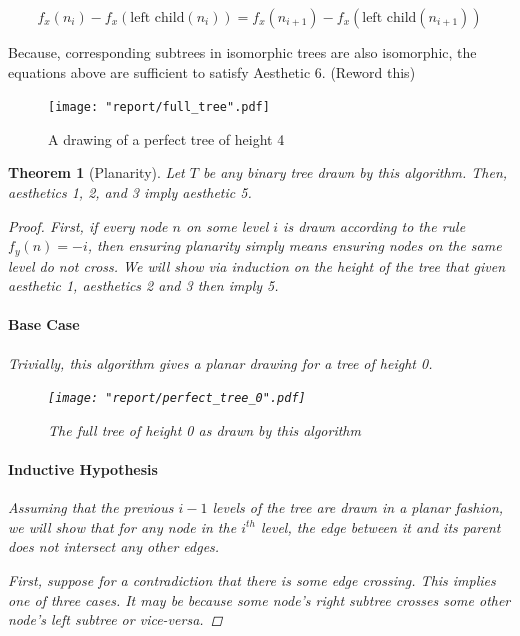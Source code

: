 \documentclass[11pt]{report}
\newcommand{\leftc}[1]{\text{left child}\left(#1\right)}
\newtheorem{theorem}{Theorem}[section]
\begin{document}
\begin{equation}
    f_x( n_i ) - f_x( \leftc{n_i} ) = f_x( n_{i + 1} ) - f_x( \leftc{n_{i+1}} )
\end{equation}

Because, corresponding subtrees in isomorphic trees are also isomorphic, the equations above are sufficient to satisfy Aesthetic 6. (Reword this)

\begin{figure}[H]
    \centering
    \texttt{[image: "report/full\_tree".pdf]}
    \caption{A drawing of a perfect tree of height 4}
\end{figure}

\begin{theorem}[Planarity]
    \label{tree_lp_planar}
    Let $T$ be any binary tree drawn by this algorithm. Then, aesthetics 1, 2, and 3 imply aesthetic 5.
    
    \begin{proof}
        First, if every node $n$ on some level $i$ is drawn according to the rule $f_y(n) = -i$, then ensuring planarity simply means ensuring nodes on the same level do not cross. We will show via induction on the height of the tree that given aesthetic 1, aesthetics 2 and 3 then imply 5.
        
        \bigskip
        
        \paragraph{Base Case} Trivially, this algorithm gives a planar drawing for a tree of height 0.
        
        \begin{figure}[H]
            \centering
            \texttt{[image: "report/perfect\_tree\_0".pdf]}
            \caption{The full tree of height 0 as drawn by this algorithm}
        \end{figure}
        
        \paragraph{Inductive Hypothesis} Assuming that the previous $i - 1$ levels of the tree are drawn in a planar fashion, we will show that for any node in the $i^{th}$ level, the edge between it and its parent does not intersect any other edges.
        
        \bigskip
        
        First, suppose for a contradiction that there is some edge crossing. This implies one of three cases. It may be because some node's right subtree crosses some other node's left subtree or vice-versa.
        

\end{proof}
\end{theorem}
\end{document}
